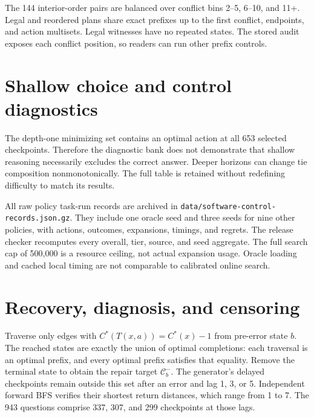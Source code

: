 The 144 interior-order pairs are balanced over conflict bins 2--5,
6--10, and 11+. Legal and reordered plans share exact prefixes up to
the first conflict, endpoints, and action multisets. Legal witnesses
have no repeated states. The stored audit exposes each conflict position,
so readers can run other prefix controls.

\begin{table}[t]
\centering\small
\caption{A prefix-only software control returns the first conflict if
it appears within $k$ executed operations, otherwise ``all legal.''
The denominator is all 288 continuation questions.}

\end{table}

\section{Shallow choice and control diagnostics}
\begin{table}[t]
\centering\small
\caption{Measured finite-horizon choice sets for all 653 next-action
questions. Any/all refer to optimistic/pessimistic ties; uniform tie
correctness is an exact average, not a sampled policy result.}
\resizebox{\columnwidth}{!}{}
\end{table}
The depth-one minimizing set contains an optimal action at all 653
selected checkpoints. Therefore the diagnostic bank does not demonstrate
that shallow reasoning necessarily excludes the correct answer.
Deeper horizons can change tie composition nonmonotonically. The full
table is retained without redefining difficulty to match its results.

\begin{table}[t]
\centering\small
\caption{Structural policy completion by operation-length bin.
Each nonoracle policy has three tie-order seeds per episode.}
\resizebox{\columnwidth}{!}{}
\end{table}
All \RawPolicyRuns{} raw policy task-run records are archived in
\texttt{data/software-control-records.json.gz}. They include one oracle
seed and three seeds for nine other policies, with actions, outcomes,
expansions, timings, and regrets. The release checker recomputes every
overall, tier, source, and seed aggregate. The full search cap of
500,000 is a resource ceiling, not actual expansion usage. Oracle loading
and cached local timing are not comparable to calibrated online search.

\section{Recovery, diagnosis, and censoring}
Traverse only edges with $C^*(T(x,a))=C^*(x)-1$ from pre-error state
$b$. The reached states are exactly the union of optimal completions:
each traversal is an optimal prefix, and every optimal prefix satisfies
that equality. Remove the terminal state to obtain the repair target
$\mathcal C_b^{-}$. The generator's delayed checkpoints remain outside
this set after an error and lag 1, 3, or 5. Independent forward BFS
verifies their shortest return distances, which range from 1 to 7.
The 943 questions comprise 337, 307, and 299 checkpoints at those lags.


